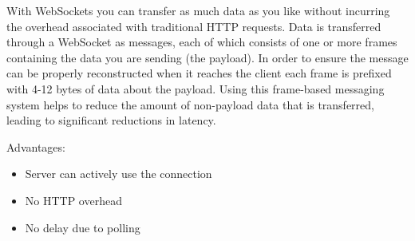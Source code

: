 \documentclass[11pt]{article}
\begin{document}
With WebSockets you can transfer as much data as you like without incurring the overhead associated with traditional HTTP requests. Data is transferred through a WebSocket as messages, each of which consists of one or more frames containing the data you are sending (the payload). In order to ensure the message can be properly reconstructed when it reaches the client each frame is prefixed with 4-12 bytes of data about the payload. Using this frame-based messaging system helps to reduce the amount of non-payload data that is transferred, leading to significant reductions in latency.

Advantages:
\begin{itemize}
\item Server can actively use the connection
\item No HTTP overhead
\item No delay due to polling
\end{itemize}
\end{document}
